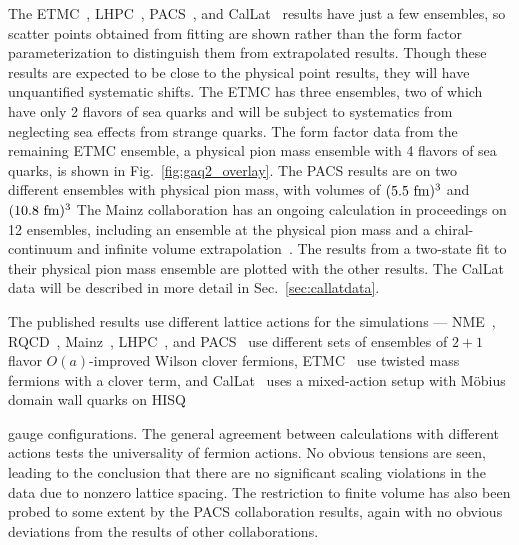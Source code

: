 The ETMC~\cite{Alexandrou:2020okk}, LHPC~\cite{Hasan:2017wwt},
 PACS~\cite{Ishikawa:2018rew,Shintani:2018ozy,Ishikawa:2021eut}, and CalLat~\cite{Meyer:2021vfq}
 results have just a few ensembles, so scatter points obtained from fitting
 are shown rather than the form factor parameterization to distinguish
 them from extrapolated results.
Though these results are expected to be close to the physical point results,
 they will have unquantified systematic shifts.
The ETMC has three ensembles, two of which have only 2 flavors of sea quarks
 and will be subject to systematics from neglecting sea effects from strange quarks.
The form factor data from the remaining ETMC ensemble,
 a physical pion mass ensemble with 4 flavors of sea quarks,
 is shown in Fig.~\ref{fig:gaq2_overlay}.
The PACS results are on two different ensembles with physical pion mass,
 with volumes of $(5.5~{\rm fm})^3$ and $(10.8~{\rm fm})^3$
The Mainz collaboration has an ongoing calculation in proceedings on 12 ensembles,
 including an ensemble at the physical pion mass
 and a chiral-continuum and infinite volume extrapolation~\cite{Djukanovic:2021yqg}.
The results from a two-state fit to their physical pion mass ensemble
 are plotted with the other results.
The CalLat data will be described in more detail in Sec.~\ref{sec:callatdata}.

The published results use different lattice actions for the simulations ---
 NME~\cite{Park:2021ypf}, RQCD~\cite{RQCD:2019jai}, Mainz~\cite{Djukanovic:2021yqg},
 LHPC~\cite{Hasan:2017wwt}, and PACS~\cite{Ishikawa:2018rew,Shintani:2018ozy,Ishikawa:2021eut}
 use different sets of ensembles of $2+1$ flavor $O(a)$-improved Wilson clover fermions,
 ETMC~\cite{Alexandrou:2020okk} use twisted mass fermions with a clover term,
 and CalLat~\cite{Meyer:2021vfq} uses a mixed-action setup with M\"obius domain wall quarks
 on HISQ~\cite{MILC:2012znn}%
 \begin{marginnote}
 \end{marginnote}%
 gauge configurations.
The general agreement between calculations with different actions tests
 the universality of fermion actions.
No obvious tensions are seen,
 leading to the conclusion that there are no significant scaling violations
 in the data due to nonzero lattice spacing.
The restriction to finite volume has also been probed to some extent by
 the PACS collaboration results, %
 again with no obvious deviations from the results of other collaborations.

